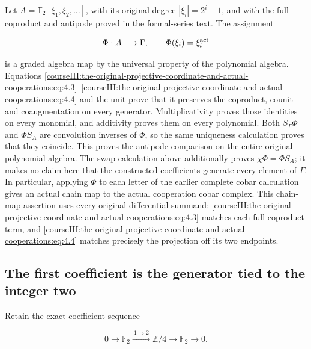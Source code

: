 Let \(A=\mathbb F_2[\xi_1,\xi_2,\ldots]\), with its original degree \(|\xi_i|=2^i-1\), and with the full coproduct and antipode proved in the formal-series text. The assignment

\begin{equation}
\Phi:A\longrightarrow\Gamma,\qquad
       \Phi(\xi_i)=\xi_i^{\rm act}
 \label{courseIII:the-original-projective-coordinate-and-actual-cooperations:eq:4.5}
\end{equation}

is a graded algebra map by the universal property of the polynomial algebra. Equations \eqref{courseIII:the-original-projective-coordinate-and-actual-cooperations:eq:4.3}--\eqref{courseIII:the-original-projective-coordinate-and-actual-cooperations:eq:4.4} and the unit prove that it preserves the coproduct, counit and coaugmentation on every generator. Multiplicativity proves those identities on every monomial, and additivity proves them on every polynomial. Both \(S_\Gamma\Phi\) and \(\Phi S_A\) are convolution inverses of \(\Phi\), so the same uniqueness calculation proves that they coincide. This proves the antipode comparison on the entire original polynomial algebra. The swap calculation above additionally proves \(\chi\Phi=\Phi S_A\); it makes no claim here that the constructed coefficients generate every element of \(\Gamma\). In particular, applying \(\Phi\) to each letter of the earlier complete cobar calculation gives an actual chain map to the actual cooperation cobar complex. This chain-map assertion uses every original differential summand: \eqref{courseIII:the-original-projective-coordinate-and-actual-cooperations:eq:4.3} matches each full coproduct term, and \eqref{courseIII:the-original-projective-coordinate-and-actual-cooperations:eq:4.4} matches precisely the projection off its two endpoints.

\subsection{The first coefficient is the generator tied to the integer two}
\label{courseIII:the-original-projective-coordinate-and-actual-cooperations:projective-original-two}

\label{courseIII:the-original-projective-coordinate-and-actual-cooperations:section-5}\label{courseIII:projective-coop:5}

Retain the exact coefficient sequence

\begin{equation}
0\longrightarrow\mathbb F_2\xrightarrow{\ 1\mapsto2\ }
 \mathbb Z/4\longrightarrow\mathbb F_2\longrightarrow0.
 \label{courseIII:the-original-projective-coordinate-and-actual-cooperations:eq:5.1}
\end{equation}

